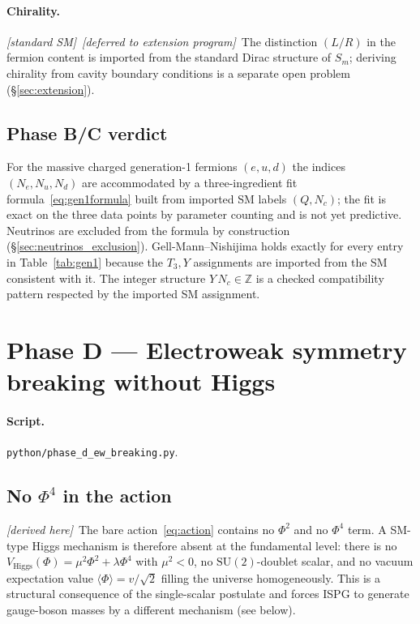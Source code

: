 \documentclass[11pt]{article}
\newcommand{\derived}{\textit{[derived here]}}
\newcommand{\fromSM}{\textit{[standard SM]}}
\newcommand{\deferred}{\textit{[deferred to extension program]}}
\begin{document}
\paragraph{Chirality.} \fromSM\ \deferred\ The distinction
$(L/R)$ in the fermion content is imported from the standard
Dirac structure of $S_m$; deriving chirality from cavity
boundary conditions is a separate open problem
(\S\ref{sec:extension}).

\subsection{Phase B/C verdict}

For the massive charged generation-1 fermions $(e,u,d)$ the
indices $(N_e,N_u,N_d)$ are accommodated by a three-ingredient
fit formula~\eqref{eq:gen1formula} built from imported SM
labels $(Q,N_c)$; the fit is exact on the three data
points by parameter counting and is not yet predictive.
Neutrinos are excluded from the formula by construction
(\S\ref{sec:neutrinos_exclusion}). Gell-Mann--Nishijima holds
exactly for every entry in Table~\ref{tab:gen1} because the
$T_3,Y$ assignments are imported from the SM consistent with
it. The integer structure $Y\,N_c\in\mathbb{Z}$ is a checked
compatibility pattern respected by the imported SM assignment.

\section{Phase D --- Electroweak symmetry breaking without Higgs}
\label{sec:phaseD}

\paragraph{Script.} \texttt{python/phase\_d\_ew\_breaking.py}.

\subsection{No $\Phi^4$ in the action}

\derived\ The bare action~\eqref{eq:action} contains no
$\Phi^2$ and no $\Phi^4$ term. A SM-type Higgs mechanism is
therefore absent at the fundamental level: there is no
$V_{\mathrm{Higgs}}(\Phi)=\mu^2\Phi^2+\lambda\Phi^4$ with
$\mu^2<0$, no $\mathrm{SU}(2)$-doublet scalar, and no vacuum
expectation value $\langle\Phi\rangle=v/\sqrt{2}$ filling the
universe homogeneously. This is a structural consequence of the
single-scalar postulate and forces ISPG to generate
gauge-boson masses by a different mechanism (see below).
\end{document}
